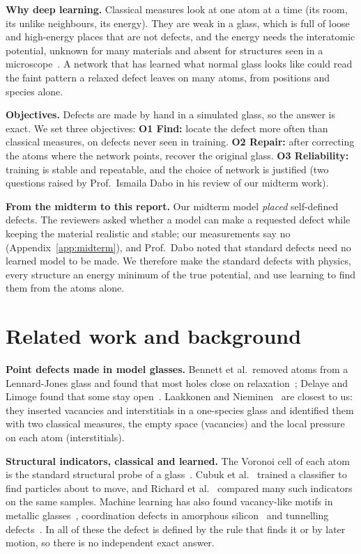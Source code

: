 \documentclass[10pt]{article}
\begin{document}
\textbf{Why deep learning.} Classical measures look at one atom at a time (its room, its unlike neighbours, its energy). They are weak in a glass, which is full of loose and high-energy places that are not defects, and the energy needs the interatomic potential, unknown for many materials and absent for structures seen in a microscope~\citep{huang2012}. A network that has learned what normal glass looks like could read the faint pattern a relaxed defect leaves on many atoms, from positions and species alone.

\textbf{Objectives.} Defects are made by hand in a simulated glass, so the answer is exact. We set three objectives:
\textbf{O1 Find:} locate the defect more often than classical measures, on defects never seen in training.
\textbf{O2 Repair:} after correcting the atoms where the network points, recover the original glass.
\textbf{O3 Reliability:} training is stable and repeatable, and the choice of network is justified (two questions raised by Prof.\ Ismaila Dabo in his review of our midterm work).

\textbf{From the midterm to this report.} Our midterm model \emph{placed} self-defined defects. The reviewers asked whether a model can make a requested defect while keeping the material realistic and stable; our measurements say no (Appendix~\ref{app:midterm}), and Prof.\ Dabo noted that standard defects need no learned model to be made. We therefore make the standard defects with physics, every structure an energy minimum of the true potential, and use learning to find them from the atoms alone.

\section{Related work and background}
\label{sec:related}

\textbf{Point defects made in model glasses.} Bennett et al.\ removed atoms from a Lennard-Jones glass and found that most holes close on relaxation~\citep{bennett1979}; Delaye and Limoge found that some stay open~\citep{delaye1993}. Laakkonen and Nieminen~\citep{laakkonen1988} are closest to us: they inserted vacancies and interstitials in a one-species glass and identified them with two classical measures, the empty space (vacancies) and the local pressure on each atom (interstitials).

\textbf{Structural indicators, classical and learned.} The Voronoi cell of each atom is the standard structural probe of a glass~\citep{starr2002}. Cubuk et al.~\citep{cubuk2015} trained a classifier to find particles about to move, and Richard et al.~\citep{richard2020} compared many such indicators on the same samples. Machine learning has also found vacancy-like motifs in metallic glasses~\citep{yuan2023}, coordination defects in amorphous silicon~\citep{morrow2024} and tunnelling defects~\citep{ciarella2023}. In all of these the defect is defined by the rule that finds it or by later motion, so there is no independent exact answer.
\end{document}
